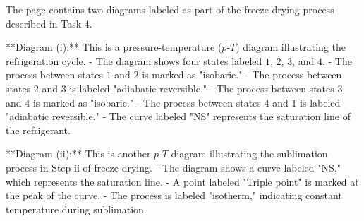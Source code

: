 The page contains two diagrams labeled as part of the freeze-drying process described in Task 4.  

**Diagram (i):**  
This is a pressure-temperature (\( p \)-\( T \)) diagram illustrating the refrigeration cycle.  
- The diagram shows four states labeled \( 1 \), \( 2 \), \( 3 \), and \( 4 \).  
- The process between states \( 1 \) and \( 2 \) is marked as "isobaric."  
- The process between states \( 2 \) and \( 3 \) is labeled "adiabatic reversible."  
- The process between states \( 3 \) and \( 4 \) is marked as "isobaric."  
- The process between states \( 4 \) and \( 1 \) is labeled "adiabatic reversible."  
- The curve labeled "NS" represents the saturation line of the refrigerant.  

**Diagram (ii):**  
This is another \( p \)-\( T \) diagram illustrating the sublimation process in Step ii of freeze-drying.  
- The diagram shows a curve labeled "NS," which represents the saturation line.  
- A point labeled "Triple point" is marked at the peak of the curve.  
- The process is labeled "isotherm," indicating constant temperature during sublimation.